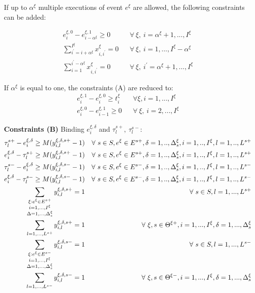 \documentclass[]{interact}
\theoremstyle{plain}%
\theoremstyle{definition}
\theoremstyle{remark}
\begin{document}
If up to $\alpha^{\xi}$ multiple executions of event $e^{\xi}$ are allowed, the following constraints can be added:

\begin{eqnarray}
e^{\xi,0}_{i} - e^{\xi,1}_{i-\alpha^{\xi}} \ge 0 && \forall\ \xi,\ i=\alpha^{\xi}+1,...,I^{\xi} \\
\sum_{i^{'}=i+\alpha^{\xi}}^{I^{\xi}} x^{\xi}_{i,i^{'}}=0&& \forall\ \xi,\ i=1,...,I^{\xi}-\alpha^{\xi}\\
\sum_{i=1}^{i^{'}-\alpha^{\xi}} x^{\xi}_{i,i^{'}}=0&&\forall\ \xi,\ i^{'}=\alpha^{\xi}+1, ..., I^{\xi}
\end{eqnarray}

If $\alpha^{\xi}$ is equal to one, the constraints (A) are reduced to:
\begin{eqnarray}
e^{\xi,1}_{i} - e^{\xi,0}_{i} \ge t^{\xi}_{i} && \forall \xi, i=1,...,I^{\xi}\\
e^{\xi,0}_{i} - e^{\xi,1}_{i-1} \ge 0&& \forall\ \xi,\ i=2,...,I^{\xi} 
\end{eqnarray}

\textbf{Constraints (B)} Binding $e^{\xi,\delta}_i$ and $\tau^{s+}_l,\ \tau^{s-}_l$:
\begin{eqnarray}
\tau^{s+}_l - e^{\xi,\delta}_i \ge M(y^{\xi,\delta,s+}_{i,l}-1)&&\forall\ s\in S,e^{\xi}\in E^{s+},\delta=1,..,\Delta^{\xi}_s,i=1,..,I^{\xi},l=1,..,L^{s+} \\
e^{\xi,\delta}_i - \tau^{s+}_l \ge M(y^{\xi,\delta,s+}_{i,l}-1)&&\forall\ s\in S,e^{\xi}\in E^{s+},\delta=1,..,\Delta^{\xi}_s,i=1,..,I^{\xi},l=1,..,L^{s+}\\
\tau^{s-}_l - e^{\xi,\delta}_i \ge M(y^{\xi,\delta,s-}_{i,l}-1)&&\forall\ s\in S,e^{\xi}\in E^{s-},\delta=1,..,\Delta^{\xi}_s,i=1,..,I^{\xi},l=1,..,L^{s-}\\
e^{\xi,\delta}_i - \tau^{s-}_l \ge M(y^{\xi,\delta,s-}_{i,l}-1)&&\forall\ s\in S,e^{\xi}\in E^{s-},\delta=1,..,\Delta^{\xi}_s,i=1,..,I^{\xi},l=1,..,L^{s-}\\
\sum_{\begin{subarray}{c} \xi:e^{\xi}\in E^{s+} \\ i=1,...,I^{\xi}\\\Delta=1,..., \Delta^{\xi}_s\end{subarray}} y^{\xi,\delta,s+}_{i,l}=1&& \forall\ s\in S,l=1,...,L^{s+}\\
\sum_{l=1,...,L^{s+}} y^{\xi,\delta,s+}_{i,l}=1&&\forall\ \xi,s\in \Theta^{\xi+},i=1,...,I^{\xi},\delta=1,...,\Delta^{\xi}_{s}\\
\sum_{\begin{subarray}{c} \xi:e^{\xi}\in E^{s-} \\ i=1,...,I^{\xi}\\\Delta=1,..., \Delta^{\xi}_s\end{subarray}} y^{\xi,\delta,s-}_{i,l}=1&& \forall\ s\in S,l=1,...,L^{s-}\\
\sum_{l=1,...,L^{s-}} y^{\xi,\delta,s-}_{i,l}=1&&\forall\ \xi, s\in \Theta^{\xi-}, i=1,...,I^{\xi},\delta=1,...,\Delta^{\xi}_{s}\\
\end{eqnarray}
\end{document}
